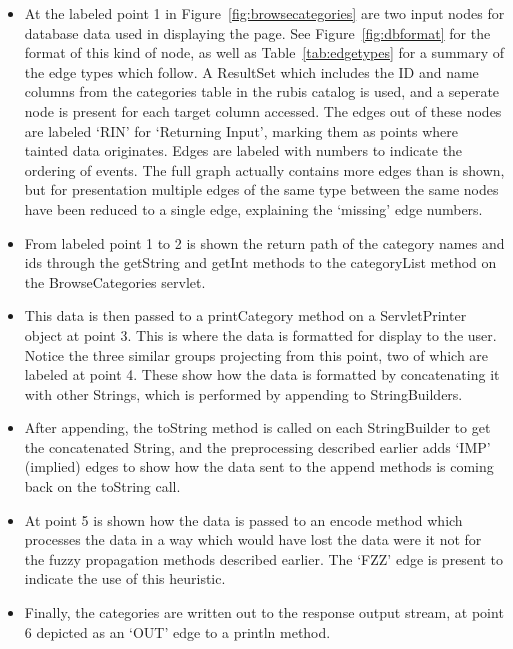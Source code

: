 \documentclass[msc,oneside]{ubcthesis}
\begin{document}
\begin{itemize}
\item At the labeled point 1 in Figure~\ref{fig:browsecategories} are two input nodes for database data used in displaying the page. See Figure~\ref{fig:dbformat} for the format of this kind of node, as well as Table~\ref{tab:edgetypes} for a summary of the edge types which follow.  A ResultSet which includes the ID and name columns from the categories table in the rubis catalog is used, and a seperate node is present for each target column accessed. The edges out of these nodes are labeled `RIN' for `Returning Input', marking them as points where tainted data originates. Edges are labeled with numbers to indicate the ordering of events. The full graph actually contains more edges than is shown, but for presentation multiple edges of the same type between the same nodes have been reduced to a single edge, explaining the `missing' edge numbers.
\item From labeled point 1 to 2 is shown the return path of the category names and ids through the getString and getInt methods to the categoryList method on the BrowseCategories servlet. 
\item This data is then passed to a printCategory method on a ServletPrinter object at point 3. This is where the data is formatted for display to the user. Notice the three similar groups projecting from this point, two of which are labeled at point 4. These show how the data is formatted by concatenating it with other Strings, which is performed by appending to StringBuilders.
\item After appending, the toString method is called on each StringBuilder to get the concatenated String, and the preprocessing described earlier adds `IMP' (implied) edges to show how the data sent to the append methods is coming back on the toString call.
\item At point 5 is shown how the data is passed to an encode method which processes the data in a way which would have lost the data were it not for the fuzzy propagation methods described earlier. The `FZZ' edge is present to indicate the use of this heuristic.
\item Finally, the categories are written out to the response output stream, at point 6 depicted as an `OUT' edge to a println method.
\end{itemize}   

\end{document}
